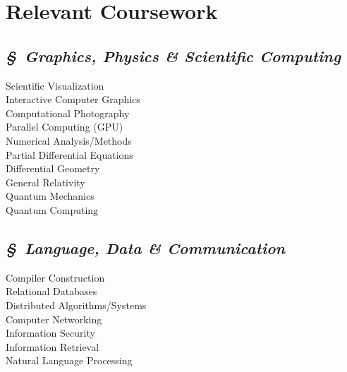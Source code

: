 \documentclass[11pt]{article}
\begin{document}
\begin{minipage}{250pt}
\section*{\sc Relevant Coursework}
\subsection*{\it \S\ Graphics, Physics \& Scientific Computing}
Scientific Visualization\\
Interactive Computer Graphics\\
Computational Photography\\
Parallel Computing (GPU)\\
Numerical Analysis/Methods\\
Partial Differential Equations\\
Differential Geometry\\
General Relativity\\
Quantum Mechanics\\
Quantum Computing

\subsection*{\it \S\ Language, Data \& Communication}
Compiler Construction\\
Relational Databases\\
Distributed Algorithms/Systems\\
Computer Networking\\
Information Security\\
Information Retrieval\\
Natural Language Processing

\end{minipage}
\end{document}
